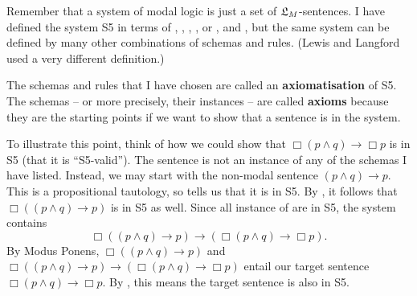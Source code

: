 \begin{solution}
\begin{sollist}
\end{sollist}
\end{solution}

Remember that a system of modal logic is just a set of $\mathfrak{L}_{M}$-sentences. I
have defined the system S5 in terms of , , , , or
,  and , but the same system can be defined by many
other combinations of schemas and rules. (Lewis and Langford used a very
different definition.)

The schemas and rules that I have chosen are called an \textbf{axiomatisation}
of S5. The schemas -- or more precisely, their instances -- are called
\textbf{axioms} because they are the starting points if we want to show that a
sentence is in the system.


To illustrate this point, think of how we could show that
$\Box(p \land q) \to \Box p$ is in S5 (that it is ``S5-valid''). The sentence is
not an instance of any of the schemas I have listed. Instead, we may start with
the non-modal sentence $(p \land q) \to p$. This is a propositional tautology,
so  tells us that it is in S5. By , it follows that
$\Box((p \land q) \to p)$ is in S5 as well. Since all instance of
 are in S5, the system contains
\[
  \Box((p \land q) \to p) \to (\Box(p \land q) \to \Box p).
\]
By Modus Ponens, $\Box((p \land q) \to p)$ and
$\Box((p \land q) \to p) \to (\Box(p \land q) \to \Box p)$ entail our target
sentence $\Box(p \land q) \to \Box p$. By , this means the target
sentence is also in S5.

